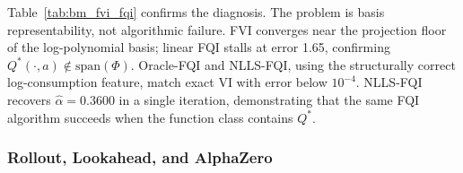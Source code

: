 Table~\ref{tab:bm_fvi_fqi} confirms the diagnosis. The problem is basis representability, not algorithmic failure. FVI converges near the projection floor of the log-polynomial basis; linear FQI stalls at error 1.65, confirming $Q^*(\cdot, a) \notin \mathrm{span}(\Phi)$. Oracle-FQI and NLLS-FQI, using the structurally correct log-consumption feature, match exact VI with error below $10^{-4}$. NLLS-FQI recovers $\hat{\alpha} = 0.3600$ in a single iteration, demonstrating that the same FQI algorithm succeeds when the function class contains $Q^*$.

\begin{table}[h]
\centering
\small
\caption[Convergence metrics for five methods on the Brock--Mirman economy.]{\textbf{Convergence metrics for five methods on the Brock--Mirman economy.} ($N_K = 50$, $N_Z = 2$, $\gamma = 0.96$). Policy agreement is measured against the closed-form optimal policy $k' = \alpha \beta z k^\alpha$.}
\label{tab:bm_fvi_fqi}

\end{table}


\subsubsection{Rollout, Lookahead, and AlphaZero}

